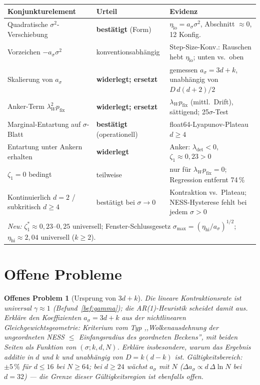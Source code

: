 \documentclass[11pt,a4paper]{article}
\newtheorem{vermutung}{Offenes Problem}
\theoremstyle{remark}
\begin{document}
\begin{center}
\begin{tabular}{p{6.1cm}lp{6.3cm}}
\toprule
Konjunkturelement & Urteil & Evidenz\\
\midrule
Quadratische $\sigma^2$-Verschiebung & \textbf{bestätigt} (Form) &
$\eta_{\mathrm{lo}}=a_\sigma\sigma^2$, Abschnitt $\approx0$, 12 Konfig.\\
Vorzeichen $-a_\sigma\sigma^2$ & konventionsabhängig &
Step-Size-Konv.: Rauschen hebt $\eta_{\mathrm{lo}}$; unten vs.\ oben\\
Skalierung von $a_\sigma$ & \textbf{widerlegt; ersetzt} &
gemessen $a_\sigma=3d+k$, unabhängig von $D\,d(d{+}2)/2$\\
Anker-Term $\lambda_W^2p_{\mathrm{fix}}$ & \textbf{widerlegt; ersetzt} &
$\lambda_Wp_{\mathrm{fix}}$ (mittl.\ Drift), sättigend; 25$\sigma$-Test\\
Marginal-Entartung auf $\sigma$-Blatt & \textbf{bestätigt} (operationell) &
float64-Lyapunov-Plateau $d\ge4$\\
Entartung unter Ankern erhalten & \textbf{widerlegt} &
Anker: $\lambda_{\mathrm{det}}<0$, $\zeta_1\approx0{,}23>0$\\
$\zeta_1=0$ bedingt & teilweise &
nur für $\lambda_Wp_{\mathrm{fix}}=0$; Regression entfernt 74\,\%\\
Kontinuierlich $d=2$ / subkritisch $d\ge4$ & bestätigt bei $\sigma\to0$ &
Kontraktion vs.\ Plateau; NESS-Hysterese fehlt bei jedem $\sigma>0$\\
\midrule
\multicolumn{3}{l}{\emph{Neu:} $\zeta_1^\ast\approx0{,}23$--$0{,}25$ universell;
Fenster-Schlussgesetz $\sigma_{\max}=(\eta_{\mathrm{hi}}/a_\sigma)^{1/2}$;
$\eta_{\mathrm{hi}}\approx2{,}04$ universell ($k\ge2$).}\\
\bottomrule
\end{tabular}
\end{center}

\section{Offene Probleme}\label{sec:offen}

\begin{vermutung}[Ursprung von $3d+k$]\label{prob:3dk}
Die lineare Kontraktionsrate ist universal $\gamma\approx1$
(Befund~\ref{bef:gamma}); die AR(1)-Heuristik scheidet damit aus.
Erkläre den Koeffizienten $a_\sigma=3d+k$ aus der nichtlinearen
Gleichgewichtsgeometrie: Kriterium vom Typ ,,Wolkenausdehnung der
ungeordneten NESS $\le$ Einfangsradius des geordneten Beckens'', mit
beiden Seiten als Funktion von $(\sigma;k,d,N)$. Erkläre insbesondere,
warum das Ergebnis additiv in $d$ und $k$ und unabhängig von
$D=k(d-k)$ ist. Gültigkeitsbereich: $\pm5\,\%$ für $d\le16$ bei
$N\ge64$; bei $d\ge24$ wächst $a_\sigma$ mit $N$
($\Delta a_\sigma\propto d\,\Delta\ln N$ bei $d=32$) --- die Grenze
dieser Gültigkeitsregion ist ebenfalls offen.
\end{vermutung}
\end{document}
